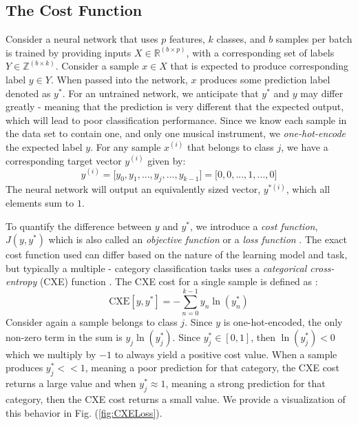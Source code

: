 \documentclass[conference,onecolumn,letterpaper]{IEEEtran}
\begin{document}

\subsection{The Cost Function}
\label{subsec:CostFunction}

Consider a neural network that uses $p$ features, $k$ classes, and $b$ samples per batch is trained by providing inputs $X \in \mathbb{R}^{(b \times p)}$, with a corresponding set of labels $Y \in \mathbb{Z}^{(b \times k)}$. Consider a sample $x \in X$ that is expected to produce corresponding label $y \in Y$. When passed into the network, $x$ produces some prediction label denoted as $y^*$. For an untrained network, we anticipate that $y^*$ and $y$ may differ greatly - meaning that the prediction is very different that the expected output, which will lead to poor classification performance. Since we know each sample in the data set to contain one, and only one musical instrument, we \textit{one-hot-encode} the expected label $y$. For any sample $x^{(i)}$ that belongs to class $j$, we have a corresponding target vector $y^{(i)}$ given by:
\begin{equation}
    \label{eqn:OneHotEnc}
    y^{(i)} = \big[ y_{0} , y_{1}, ... , y_{j}, ... , y_{k-1} \big] = \big[ 0, 0, ... , 1, ... , 0 \big]
\end{equation}
The neural network will output an equivalently sized vector, $y^{*(i)}$, which all elements sum to $1$.

To quantify the difference between $y$ and $y^*$, we introduce a \textit{cost function}, $J(y,y^*)$ which is also called an \textit{objective function} or a \textit{loss function} \cite{James}. The exact cost function used can differ based on the nature of the learning model and task, but typically a multiple - category classification tasks uses a \textit{categorical cross-entropy} (CXE) function \cite{Geron,Goodfellow}. The CXE cost for a single sample is defined as \cite{Goodfellow,Virtanen}:
\begin{equation}
    \label{eqn:CXELoss}
    \text{CXE}[y,y^*] = - \sum_{n=0}^{k-1} y_{n} \ln(y^*_{n})
\end{equation}
Consider again a sample belongs to class $j$. Since $y$ is one-hot-encoded, the only non-zero term in the sum is $y_{j} \ln(y^*_{j})$. Since $y^*_{j} \in [0,1]$, then $\ln(y^*_{j}) < 0$ which we multiply by $-1$ to always yield a positive cost value. When a sample produces $y^*_{j} << 1$, meaning a poor prediction for that category, the CXE cost returns a large value and when $y^*_{j} \approx 1$, meaning a strong prediction for that category, then the CXE cost returns a small value. We provide a visualization of this behavior in Fig. (\ref{fig:CXELoss}).
\end{document}
